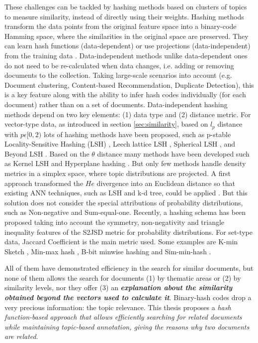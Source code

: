 These challenges can be tackled by hashing methods based on clusters of topics to measure similarity, instead of directly using their weights. Hashing methods transform the data points from the original feature space into a binary-code Hamming space, where the similarities in the original space are preserved. They can learn hash functions (data-dependent) or use projections (data-independent) from the training data \citep{Wang2016}. Data-independent methods unlike data-dependent ones do not need to be re-calculated when data changes, i.e. adding or removing documents to the collection. Taking large-scale scenarios into account (e.g. Document clustering, Content-based Recommendation, Duplicate Detection), this is a key feature along with the ability to infer hash codes individually (for each document) rather than on a set of documents. Data-independent hashing methods depend on two key elements: (1) data type and (2) distance metric. For vector-type data, as introduced in section \ref{sec:similarity}, based on $l_p$ distance with $p \epsilon [0,2)$ lots of hashing methods have been proposed, such as p-stable Locality-Sensitive Hashing (LSH) \citep{Datar2004}, Leech lattice LSH \citep{Andoni2006}, Spherical LSH \citep{Terasawa2007}, and Beyond LSH \citep{Andoni2014}. Based on the $\theta$ distance many methods have been developed such as Kernel LSH \citep{Kulis2012} and Hyperplane hashing \cite{Vijayanarasimhan2014}. But only few methods handle density metrics in a simplex space, where topic distributions are projected. A first approach transformed the $He$ divergence into an Euclidean distance so that existing ANN techniques, such as LSH and k-d tree, could be applied \cite{Krstovski2013a}. But this solution does not consider the special attributions of probability distributions, such as Non-negative and Sum-equal-one. Recently, a hashing schema \citep{Mao2017} has been proposed taking into account the symmetry, non-negativity and triangle inequality features of the S2JSD metric for probability distributions. For set-type data, Jaccard Coefficient is the main metric used. Some examples are K-min Sketch \citep{Li2012}, Min-max hash \citep{Ji2013}, B-bit minwise hashing \citep{Li2010b} and Sim-min-hash \citep{Zhao2013}.

All of them have demonstrated efficiency in the search for similar documents, but none of them allows the search for documents (1) by thematic areas or (2) by similarity levels, nor they offer (3) an \textbf{\textit{explanation about the similarity obtained beyond the vectors used to calculate it}}. Binary-hash codes drop a very precious information: the topic relevance. This thesis proposes a \textit{hash function-based approach that allows efficiently searching for related documents while maintaining topic-based annotation, giving the reasons why two documents are related}.


